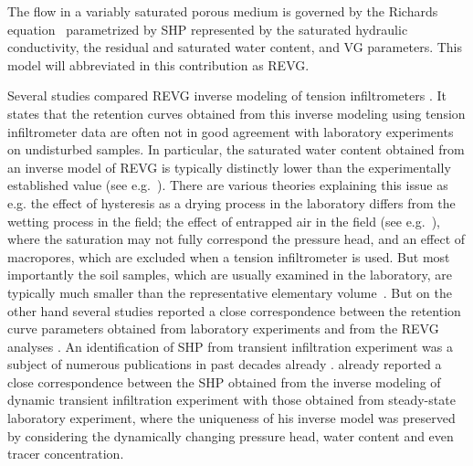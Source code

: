 \documentclass[review]{elsarticle}
\begin{document}
The flow in a variably saturated porous medium is governed by the Richards equation~\citep{richards} parametrized by SHP represented by the saturated hydraulic conductivity, the residual and saturated water content, and VG parameters. This model will abbreviated in this contribution as REVG.






 Several studies  compared REVG inverse modeling of tension infiltrometers  \citep{Verbist, Simunek1, Ventrella, Schwartz, Ramos, Simunek2, rezaei}. It states that the retention curves obtained from this inverse modeling using tension infiltrometer data are often not in good agreement with laboratory experiments on undisturbed samples. In particular, the saturated water content obtained from an inverse model of REVG is typically distinctly lower than the experimentally established value (see e.g.~\citep{Simunek1, Verbist}). 
 There are various theories explaining this issue as e.g. the effect of hysteresis as a drying process in the laboratory differs from the wetting process in the field; the effect of entrapped air in the field (see e.g.~\citep{Fodor}), where the saturation may not fully correspond the pressure head, and an effect of macropores, which are excluded when a tension infiltrometer is used.  But most importantly the soil samples, which are usually  examined in the laboratory, are typically much smaller than the representative elementary volume~\citep{scharnagl}.
But on the other hand several studies  reported a close correspondence between the retention curve parameters obtained from laboratory experiments and from the REVG analyses \citep{Ramos, Schwartz}. 
An identification of SHP  from transient infiltration experiment was a subject of numerous publications in past decades already \citep{simunek-infiltr2shp, infiltr2shp, simunek2-infiltr2shp, XU201234, BAGARELLO201770,  hess-Younes-2017}.  \cite{simunek-infiltr2shp} already reported a close correspondence between the SHP  obtained from the inverse modeling of dynamic transient infiltration experiment with those obtained from steady-state laboratory experiment, where the uniqueness of his inverse model was preserved by considering the dynamically changing pressure head, water content and even tracer concentration.
\end{document}
